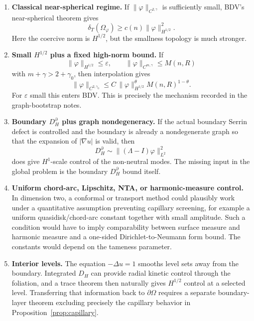\documentclass[11pt]{article}
\newcommand{\Om}{\Omega}
\newcommand{\eps}{\varepsilon}
\newcommand{\dT}{\delta_T}
\begin{document}
\begin{enumerate}[label=\textbf{(\Alph*)}]
\item \textbf{Classical near-spherical regime.}
If \(\|\varphi\|_{C^{2,\gamma}}\) is sufficiently small, BDV's
near-spherical theorem gives
\[
   \dT(\Om_\varphi)\ge c(n)\|\varphi\|_{H^{1/2}}^2.
\]
Here the coercive norm is \(H^{1/2}\), but the smallness topology is much
stronger.

\item \textbf{Small \(H^{1/2}\) plus a fixed high-norm bound.}
If
\[
   \|\varphi\|_{H^{1/2}}\le\eps,\qquad
   \|\varphi\|_{C^{m,\gamma}}\le M(n,R)
\]
with \(m+\gamma>2+\gamma_0\), then interpolation gives
\[
   \|\varphi\|_{C^{2,\gamma_0}}
      \le C\,\|\varphi\|_{H^{1/2}}^\theta
              M(n,R)^{1-\theta}.
\]
For \(\eps\) small this enters BDV.  This is precisely the mechanism recorded
in the graph-bootstrap notes.

\item \textbf{Boundary \(D_H^\partial\) plus graph nondegeneracy.}
If the actual boundary Serrin defect is controlled and the boundary is already
a nondegenerate graph so that the expansion of \(|\nabla u|\) is valid, then
\[
   D_H^\partial\sim
   \|(\Lambda-I)\varphi\|_{L^2}^2
\]
does give \(H^1\)-scale control of the non-neutral modes.  The missing input in
the global problem is the boundary \(D_H^\partial\) bound itself.

\item \textbf{Uniform chord-arc, Lipschitz, NTA, or harmonic-measure control.}
In dimension two, a conformal or transport method could plausibly work under a
quantitative assumption preventing capillary screening, for example a uniform
quasidisk/chord-arc constant together with small amplitude.  Such a condition
would have to imply comparability between surface measure and harmonic measure
and a one-sided Dirichlet-to-Neumann form bound.  The constants would depend on
the tameness parameter.

\item \textbf{Interior levels.}
The equation \(-\Delta u=1\) smooths level sets away from the boundary.
Integrated \(D_H\) can provide radial kinetic control through the foliation,
and a trace theorem then naturally gives \(H^{1/2}\) control at a selected
level.  Transferring that information back to \(\partial\Om\) requires a
separate boundary-layer theorem excluding precisely the capillary behavior in
Proposition~\ref{prop:capillary}.
\end{enumerate}
\end{document}

